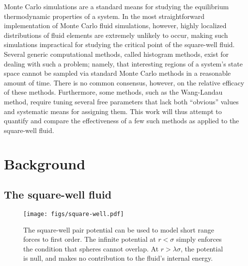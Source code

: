 \documentclass[11pt]{article}
\begin{document}
Monte Carlo simulations are a standard means for studying the
equilibrium thermodynamic properties of a system. In the most
straightforward implementation of Monte Carlo fluid simulations,
however, highly localized distributions of fluid elements are
extremely unlikely to occur, making such simulations impractical for
studying the critical point of the square-well fluid. Several generic
computational methods, called histogram methods, exist for dealing
with such a problem; namely, that interesting regions of a system's
state space cannot be sampled via standard Monte Carlo methods in a
reasonable amount of time. There is no common consensus, however, on
the relative efficacy of these methods. Furthermore, some methods,
such as the Wang-Landau method\cite{wang_landau}, require tuning
several free parameters that lack both ``obvious'' values and
systematic means for assigning them. This work will thus attempt to
quantify and compare the effectiveness of a few such methods as
applied to the square-well fluid.


\section{Background}
\label{sec:background}

\subsection{The square-well fluid}
\label{sec:sw_fluid}

\begin{figure}[tb]
  \centering
  \texttt{[image: figs/square-well.pdf]}
  \caption[The square-well pair potential]
  {The square-well pair potential can be used to model short range
    forces to first order. The infinite potential at $r<\sigma$ simply
    enforces the condition that spheres cannot overlap. At
    $r>\lambda\sigma$, the potential is null, and makes no
    contribution to the fluid's internal energy.}
  \label{fig:pair_potential}
\end{figure}
\end{document}
